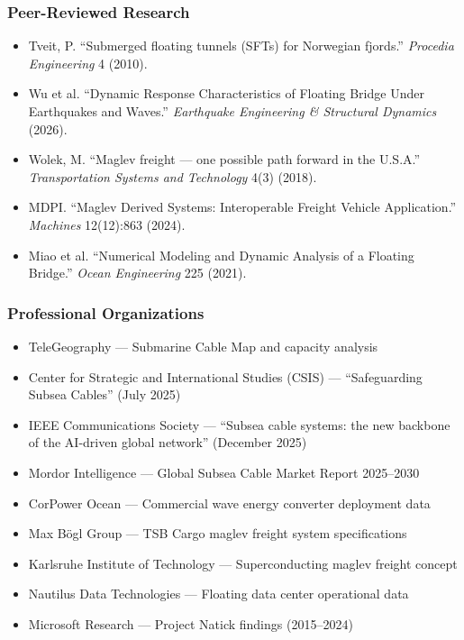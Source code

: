 \documentclass[11pt,letterpaper]{article}
\begin{document}
\subsubsection{Peer-Reviewed Research}

\begin{itemize}[leftmargin=2em]
  \item Tveit, P. ``Submerged floating tunnels (SFTs) for Norwegian fjords.'' \textit{Procedia Engineering} 4 (2010).
  \item Wu et al. ``Dynamic Response Characteristics of Floating Bridge Under Earthquakes and Waves.'' \textit{Earthquake Engineering \& Structural Dynamics} (2026).
  \item Wolek, M. ``Maglev freight --- one possible path forward in the U.S.A.'' \textit{Transportation Systems and Technology} 4(3) (2018).
  \item MDPI. ``Maglev Derived Systems: Interoperable Freight Vehicle Application.'' \textit{Machines} 12(12):863 (2024).
  \item Miao et al. ``Numerical Modeling and Dynamic Analysis of a Floating Bridge.'' \textit{Ocean Engineering} 225 (2021).
\end{itemize}

\subsubsection{Professional Organizations}

\begin{itemize}[leftmargin=2em]
  \item TeleGeography --- Submarine Cable Map and capacity analysis
  \item Center for Strategic and International Studies (CSIS) --- ``Safeguarding Subsea Cables'' (July 2025)
  \item IEEE Communications Society --- ``Subsea cable systems: the new backbone of the AI-driven global network'' (December 2025)
  \item Mordor Intelligence --- Global Subsea Cable Market Report 2025--2030
  \item CorPower Ocean --- Commercial wave energy converter deployment data
  \item Max Bögl Group --- TSB Cargo maglev freight system specifications
  \item Karlsruhe Institute of Technology --- Superconducting maglev freight concept
  \item Nautilus Data Technologies --- Floating data center operational data
  \item Microsoft Research --- Project Natick findings (2015--2024)
\end{itemize}
\end{document}
